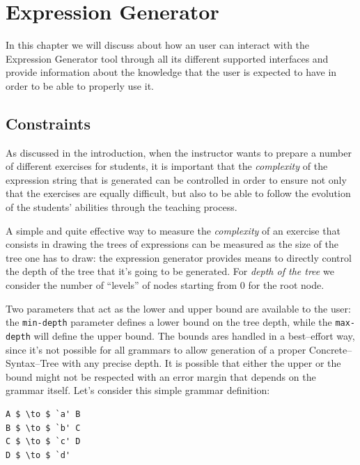 \documentclass[]{usiinfbachelorproject}
\begin{document}
\section{Expression Generator}\label{user}

In this chapter we will discuss about how an user can interact with the
Expression Generator tool through all its different supported interfaces
and provide information about the knowledge that the user is expected to
have in order to be able to properly use it.

\subsection{Constraints}\label{user-constraints}



As discussed in the introduction, when the instructor wants to prepare a number
of different exercises for students, it is important that the
\textit{complexity} of the expression string that is generated can be controlled
in order to ensure not only that the exercises are equally difficult, but also
to be able to follow the evolution of the students' abilities through the
teaching process.

A simple and quite effective way to measure the \textit{complexity} of an
exercise that consists in drawing the trees of expressions can be measured
as the size of the tree one has to draw: the expression generator provides
means to directly control the depth of the tree that it's going to be
generated. For \textit{depth of the tree} we consider the number of ``levels''
of nodes starting from 0 for the root node.

Two parameters that act as the lower and upper bound are available to
the user: the \texttt{min-depth} parameter defines a lower bound on the tree
depth, while the \texttt{max-depth} will define the upper bound.
The bounds ares handled in a best–effort way, since it's not possible for all
grammars to allow generation of a proper Concrete–Syntax–Tree with any precise
depth. It is possible that either the upper or the bound might not be respected
with an error margin that depends on the grammar itself. Let's consider this
simple grammar definition:

\begin{lstlisting}[caption={Example grammar with a fixed depth},
                   label={user-constraint-example-detph}]
A $ \to $ `a' B
B $ \to $ `b' C
C $ \to $ `c' D
D $ \to $ `d'
\end{lstlisting}
\end{document}

